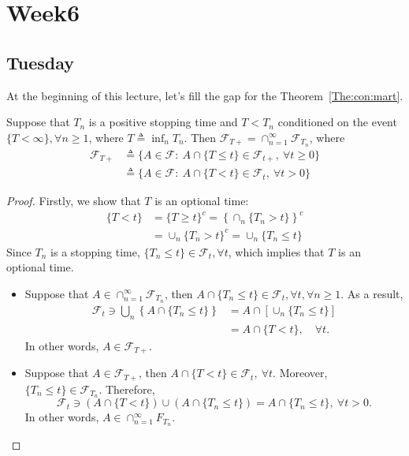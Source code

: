 
\chapter{Week6}

\section{Tuesday}

At the beginning of this lecture, let's fill the gap for the Theorem~\ref{The:con:mart}.
\begin{proposition}
Suppose that $T_n$ is a positive stopping time and $T<T_n$ conditioned on the event $\{T<\infty\},\forall n\ge1$,
where $T\triangleq \inf_nT_n$.
Then $\mathcal{F}_{T+} = \cap_{n=1}^\infty\mathcal{F}_{T_n}$, where
\begin{align*}
\mathcal{F}_{T+}&\triangleq \{A\in\mathcal{F}:~A\cap\{T\le t\}\in\mathcal{F}_{t+},~\forall t\ge0\}\\
&\triangleq \{A\in\mathcal{F}:~A\cap\{T< t\}\in\mathcal{F}_{t},~\forall t>0\}
\end{align*}
\end{proposition}

\begin{proof}
Firstly, we show that $T$ is an optional time:
\begin{align*}
\{T<t\}&=\{T\ge t\}^c=\left\{
\cap_{n}\{T_n>t\}
\right\}^c\\
&=\cup_n\{T_n>t\}^c=\cup_n\{T_n\le t\}
\end{align*}
Since $T_n$ is a stopping time, $\{T_n\le t\}\in\mathcal{F}_t,\forall t$, which implies that $T$ is an optional time.
\begin{itemize}
\item
Suppose that $A\in\cap_{n=1}^\infty\mathcal{F}_{T_n}$,
then $A\cap\{T_n\le t\}\in\mathcal{F}_t,\forall t,\forall n\ge1$.
As a result,
\begin{align*}
\mathcal{F}_t\ni\bigcup_{n}\left\{
A\cap\{T_n\le t\}
\right\}&=A\cap\left[
\cup_n\{T_n\le t\}
\right]\\
&=A\cap\{T<t\},\quad\forall t.
\end{align*}
In other words, $A\in\mathcal{F}_{T+}$.
\item
Suppose that $A\in\mathcal{F}_{T+}$, then 
$A\cap\{T< t\}\in\mathcal{F}_{t},~\forall t$.
Moreover, $\{T_n\le t\}\in\mathcal{F}_{T_n}$.
Therefore,
\[
\mathcal{F}_t\ni
(A\cap\{T< t\})\cup(A\cap\{T_n\le t\})=A\cap\{T_n\le t\},~\forall t>0.
\]
In other words, $A\in\cap_{n=1}^\infty F_{T_n}$.
\end{itemize}
\end{proof}

